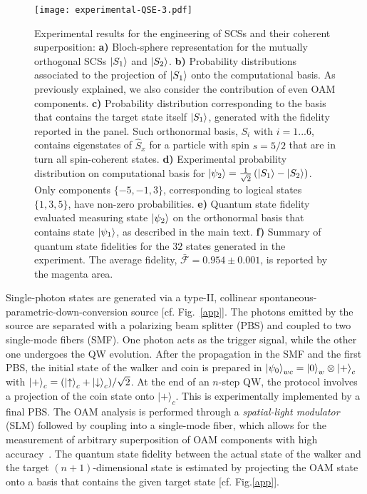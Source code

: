 \begin{figure*}[t]
\texttt{[image: experimental-QSE-3.pdf]}
\caption{Experimental results for the engineering of SCSs and their coherent superposition: {\bf a)} Bloch-sphere representation for the mutually orthogonal SCSs $\ket{S_1}$ and $\ket{S_2}$.
{\bf b)} Probability distributions associated to the projection of $\ket{S_1}$ onto the computational basis. As previously explained, we also consider the contribution of even OAM components.
{\bf c)} Probability distribution corresponding to the basis that contains the target state itself $\ket{S_1}$, generated with the fidelity reported in the panel. Such orthonormal basis, {$S_i$} with $i= 1 ...6$, contains eigenstates of $\hat{S}_x$ for a particle with spin $s=5/2$ that are in turn all spin-coherent states.
{\bf d)} Experimental probability distribution on computational basis for $\ket{\psi_2}=\frac{1}{\sqrt{2}}\left (\ket{S_1}- \ket{S_2} \right)$. Only components $\{-5, -1, 3\}$, corresponding to logical states $\{1,3,5\}$, have non-zero probabilities.
{\bf e)} Quantum state fidelity evaluated measuring state $\ket{\psi_2}$ on the orthonormal basis that contains state $\ket{\psi_1}$, as described in the main text. 
{\bf f)} Summary of quantum state fidelities for the $32$ states generated in the experiment. The average fidelity, $\bar{\mathcal{F}}=0.954\pm 0.001$, is reported by the magenta area. 
}
\label{figSpin}
\end{figure*}

Single-photon states are generated via a type-II, collinear spontaneous-parametric-down-conversion source [cf. Fig.~\ref{app}]. 
The photons emitted by the source are separated with a polarizing beam splitter (PBS) and coupled to two single-mode fibers (SMF). One photon acts as the trigger signal, while the other one undergoes the \ac{QW} evolution. After the propagation in the SMF and the first PBS, the initial state of the walker and coin is prepared in $\ket{\psi_0}_{wc}=\ket{0}_w \otimes \ket{+}_c$ with $\ket{+}_c=(\ket{{\uparrow}}_c+\ket{{\downarrow}}_c)/\sqrt2$. At the end of an $n$-step \ac{QW}, the protocol involves a projection of the coin state onto $|+\rangle_c$. This is experimentally implemented by a final PBS. The OAM analysis is performed through a \emph{spatial-light modulator} (SLM) followed by coupling into a single-mode fiber, which allows for the measurement of arbitrary superposition of OAM components with high accuracy~\cite{bolduc2013exact,dambrosio2013test}. The quantum state fidelity between the actual state of the walker and the target $(n+1)$-dimensional state is estimated by projecting the OAM state onto a basis that contains the given target state [cf. Fig.\ref{app}]. 


